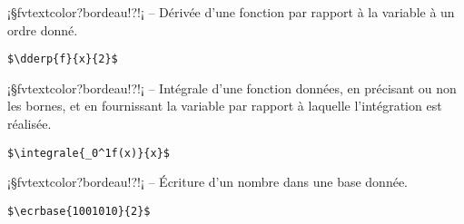 \documentclass[11pt,a4paper,rgb]{report}
\begin{document}
\setlength{\leftskip}{0pt}
\setlength{\textwidth}{18cm}%


\vspace*{.75cm}

\inCodeStub¡§fvtextcolor?bordeau!?!¡ -- Dérivée d'une fonction par rapport à la variable à un ordre donné.

\setlength{\leftskip}{.75cm}%
\setlength{\textwidth}{17.25cm}%

\colorbox{blue!15}{}
\hfill
\begin{minipage}{.65\textwidth}
	\begin{lstlisting}[linewidth=\textwidth, language={[LaTeX]TeX}]
	$\dderp{f}{x}{2}$
	\end{lstlisting}
\end{minipage}

\setlength{\leftskip}{0pt}
\setlength{\textwidth}{18cm}%


\vspace*{.75cm}

\inCodeStub¡§fvtextcolor?bordeau!?!¡ -- Intégrale d'une fonction données, en précisant ou non les bornes, et en fournissant la variable par rapport à laquelle l'intégration est réalisée.

\setlength{\leftskip}{.75cm}%
\setlength{\textwidth}{17.25cm}%

\colorbox{blue!15}{}
\hfill
\begin{minipage}{.65\textwidth}
	\begin{lstlisting}[linewidth=\textwidth, language={[LaTeX]TeX}]
	$\integrale{_0^1f(x)}{x}$
	\end{lstlisting}
\end{minipage}

\setlength{\leftskip}{0pt}
\setlength{\textwidth}{18cm}%


\vspace*{.75cm}

\inCodeStub¡§fvtextcolor?bordeau!?!¡ -- Écriture d'un nombre dans une base donnée.

\setlength{\leftskip}{.75cm}%
\setlength{\textwidth}{17.25cm}%

\colorbox{blue!15}{}
\hfill
\begin{minipage}{.65\textwidth}
	\begin{lstlisting}[linewidth=\textwidth, language={[LaTeX]TeX}]
	$\ecrbase{1001010}{2}$
	\end{lstlisting}
\end{minipage}
\end{document}
